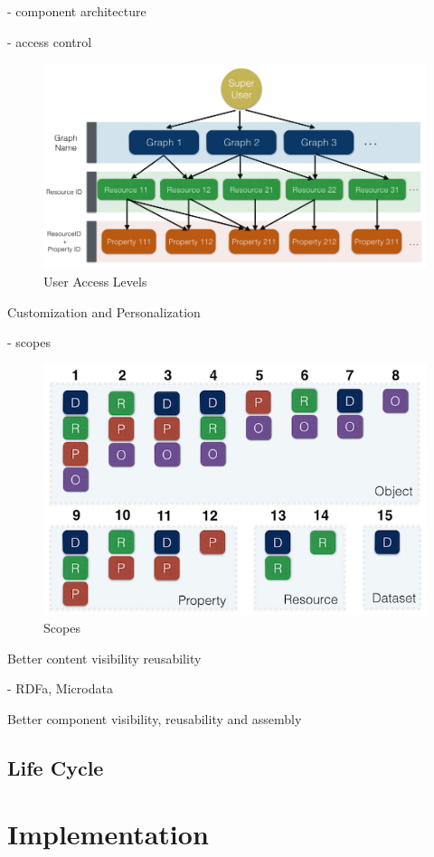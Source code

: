 \documentclass{acm_proc_article-sp}
\begin{document}
- component architecture

- access control

\begin{figure}
  \includegraphics[width=.9\linewidth]{images/userAccessLevels.jpg}
  \caption{User Access Levels}
\end{figure}


Customization and Personalization

- scopes

\begin{figure}
  \includegraphics[width=.9\linewidth]{images/scopes.jpg}
  \caption{Scopes}
\end{figure}

Better content visibility reusability

- RDFa, Microdata

Better component visibility, reusability and assembly


\subsection{Life Cycle}


\section{Implementation}
\end{document}
